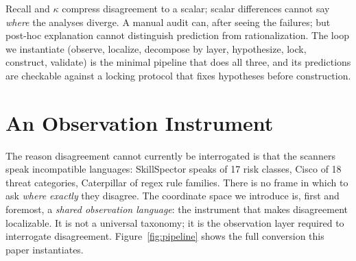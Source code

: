 \documentclass[sigconf,nonacm]{acmart}
\begin{document}
Recall and $\kappa$ compress disagreement to a scalar; scalar differences cannot say \emph{where} the analyses diverge. A manual audit can, after seeing the failures; but post-hoc explanation cannot distinguish prediction from rationalization. The loop we instantiate (observe, localize, decompose by layer, hypothesize, lock, construct, validate) is the minimal pipeline that does all three, and its predictions are checkable against a locking protocol that fixes hypotheses before construction.

\section{An Observation Instrument}
\label{sec:measure}

The reason disagreement cannot currently be interrogated is that the scanners speak incompatible languages: SkillSpector speaks of 17 risk classes, Cisco of 18 threat categories, Caterpillar of regex rule families. There is no frame in which to ask \emph{where exactly} they disagree. The coordinate space we introduce is, first and foremost, a \emph{shared observation language}: the instrument that makes disagreement localizable. It is not a universal taxonomy; it is the observation layer required to interrogate disagreement. Figure~\ref{fig:pipeline} shows the full conversion this paper instantiates.
\end{document}
